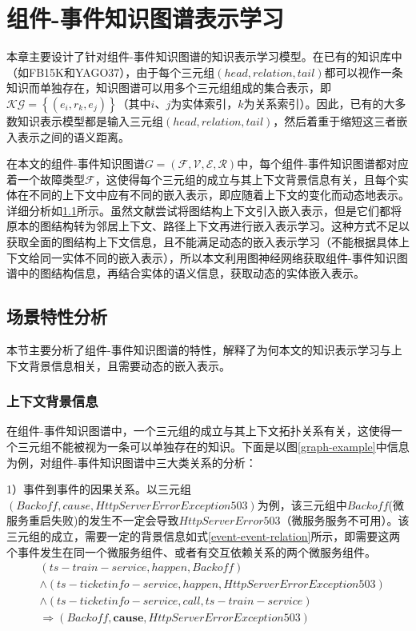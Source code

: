 \chapter{组件-事件知识图谱表示学习}
本章主要设计了针对组件-事件知识图谱的知识表示学习模型。在已有的知识库中（如FB15K\cite{bordes2013translatingE}和YAGO37\cite{guo2018knowledge}），由于每个三元组$\left(head, relation, tail\right)$都可以视作一条知识而单独存在，知识图谱可以用多个三元组组成的集合表示，即 $\mathcal{KG}=\left\{\left(e_{i}, r_{k}, e_{j}\right)\right\}$（其中$i$、$j$为实体索引，$k$为关系索引）。因此，已有的大多数知识表示模型都是输入三元组$\left(head, relation, tail\right)$，然后着重于缩短这三者嵌入表示之间的语义距离。

在本文的组件-事件知识图谱$G=(\mathcal{F}, \mathcal{V}, \mathcal{E}, \mathcal{R})$中，每个组件-事件知识图谱都对应着一个故障类型$\mathcal{F}$，这使得每个三元组的成立与其上下文背景信息有关，且每个实体在不同的上下文中应有不同的嵌入表示，即应随着上下文的变化而动态地表示。详细分析如\ref{backgroud-analysis}所示。虽然文献\parencite{feng2016gake,shi2017knowledge}尝试将图结构上下文引入嵌入表示，但是它们都将原本的图结构转为邻居上下文、路径上下文再进行嵌入表示学习。这种方式不足以获取全面的图结构上下文信息，且不能满足动态的嵌入表示学习（不能根据具体上下文给同一实体不同的嵌入表示），所以本文利用图神经网络获取组件-事件知识图谱中的图结构信息，再结合实体的语义信息，获取动态的实体嵌入表示。
\section{场景特性分析}\label{backgroud-analysis}
本节主要分析了组件-事件知识图谱的特性，解释了为何本文的知识表示学习与上下文背景信息相关，且需要动态的嵌入表示。

\subsection{上下文背景信息}\label{context-analysis}
在组件-事件知识图谱中，一个三元组的成立与其上下文拓扑关系有关，这使得一个三元组不能被视为一条可以单独存在的知识。下面是以图\ref{graph-example}中信息为例，对组件-事件知识图谱中三大类关系的分析：

1）事件到事件的因果关系。以三元组$\left(Backoff, cause, HttpServerError Exception 503\right)$为例，该三元组中$Backoff$(微服务重启失败)的发生不一定会导致$HttpServerError 503$（微服务服务不可用）。该三元组的成立，需要一定的背景信息如式\ref{event-event-relation}所示，即需要这两个事件发生在同一个微服务组件、或者有交互依赖关系的两个微服务组件。
\begin{equation}
    \begin{aligned}
        &\left ( ts-train-service, happen, Backoff \right ) \\
        &\wedge \left ( ts-ticketinfo-service, happen, HttpServerError Exception 503 \right ) \\
        &\wedge \left ( ts-ticketinfo-service, call, ts-train-service \right ) \\
        &\Rightarrow \left ( Backoff, \boldsymbol{cause}, HttpServerError Exception 503 \right )
    \end{aligned}
\label{event-event-relation}
\end{equation}

